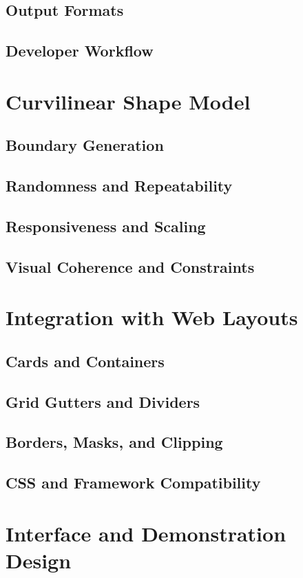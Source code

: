 \subsection{Output Formats}
\subsection{Developer Workflow}

\section{Curvilinear Shape Model}
\subsection{Boundary Generation}
\subsection{Randomness and Repeatability}
\subsection{Responsiveness and Scaling}
\subsection{Visual Coherence and Constraints}

\section{Integration with Web Layouts}
\subsection{Cards and Containers}
\subsection{Grid Gutters and Dividers}
\subsection{Borders, Masks, and Clipping}
\subsection{CSS and Framework Compatibility}

\section{Interface and Demonstration Design}

